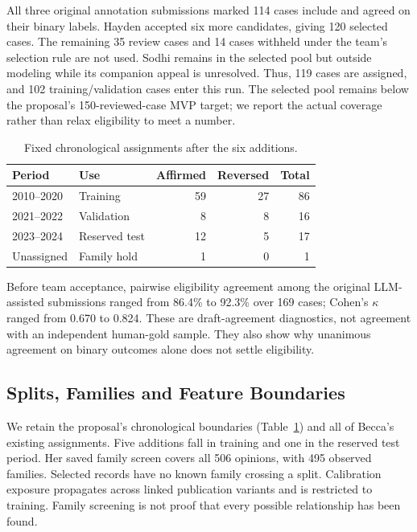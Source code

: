 \documentclass[conference]{IEEEtran}
\begin{document}
All three original annotation submissions marked 114 cases include and agreed on their binary labels. Hayden accepted six more candidates, giving 120 selected cases. The remaining 35 review cases and 14 cases withheld under the team's selection rule are not used. Sodhi remains in the selected pool but outside modeling while its companion appeal is unresolved. Thus, 119 cases are assigned, and 102 training/validation cases enter this run. The selected pool remains below the proposal's 150-reviewed-case MVP target; we report the actual coverage rather than relax eligibility to meet a number.

\begin{table}[t]
\caption{Fixed chronological assignments after the six additions.}
\label{tab:splits}
\centering\footnotesize
\begin{tabular}{llrrr}
\toprule Period & Use & Affirmed & Reversed & Total \\
\midrule
2010--2020 & Training & 59 & 27 & 86 \\
2021--2022 & Validation & 8 & 8 & 16 \\
2023--2024 & Reserved test & 12 & 5 & 17 \\
\midrule
Unassigned & Family hold & 1 & 0 & 1 \\
\bottomrule
\end{tabular}
\end{table}

Before team acceptance, pairwise eligibility agreement among the original LLM-assisted submissions ranged from 86.4\% to 92.3\% over 169 cases; Cohen's $\kappa$ ranged from 0.670 to 0.824. These are draft-agreement diagnostics, not agreement with an independent human-gold sample. They also show why unanimous agreement on binary outcomes alone does not settle eligibility.

\subsection{Splits, Families and Feature Boundaries}
We retain the proposal's chronological boundaries (Table~\ref{tab:splits}) and all of Becca's existing assignments. Five additions fall in training and one in the reserved test period. Her saved family screen covers all 506 opinions, with 495 observed families. Selected records have no known family crossing a split. Calibration exposure propagates across linked publication variants and is restricted to training. Family screening is not proof that every possible relationship has been found.
\end{document}
